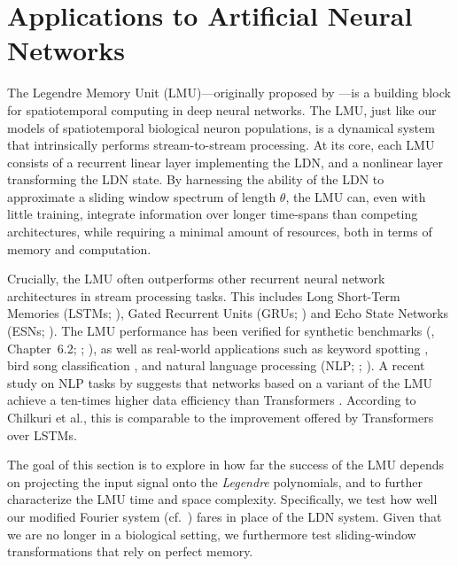 
\section{Applications to Artificial Neural Networks}
\label{sec:applications_to_ml}

The Legendre Memory Unit (LMU)---originally proposed by \citet{voelker2019lmu}---is a building block for spatiotemporal computing in deep neural networks.
The LMU, just like our models of spatiotemporal biological neuron populations, is a dynamical system that intrinsically performs stream-to-stream processing.
At its core, each LMU consists of a recurrent linear layer implementing the LDN, and a nonlinear layer transforming the LDN state.
By harnessing the ability of the LDN to approximate a sliding window spectrum of length $\theta$, the LMU can, even with little training, integrate information over longer time-spans than competing architectures, while requiring a minimal amount of resources, both in terms of memory and computation.

Crucially, the LMU often outperforms other recurrent neural network architectures in stream processing tasks.
This includes Long Short-Term Memories (LSTMs; \cite{hochreiter1997long}), Gated Recurrent Units (GRUs; \cite{chung2014empirical}) and Echo State Networks (ESNs; \cite{jaeger2004harnessing}).
The LMU performance has been verified for synthetic benchmarks (\cite{voelker2019}, Chapter~6.2; \cite{voelker2019lmu}; \cite{gu2020hippo}), as well as real-world applications such as keyword spotting \citep{blouw2021hardware}, bird song classification \citep{gupta2021comparing}, and natural language processing (NLP; \cite{chilkuri2021parallelizinga}; \cite{chilkuri2021parallelizing}).
A recent study on NLP tasks by \citet{chilkuri2021language} suggests that networks based on a variant of the LMU achieve a ten-times higher data efficiency than Transformers \citep{vaswani2017attention}.
According to Chilkuri et al., this is comparable to the improvement offered by Transformers over LSTMs.

The goal of this section is to explore in how far the success of the LMU depends on projecting the input signal onto the \emph{Legendre} polynomials, and to further characterize the LMU time and space complexity.
Specifically, we test how well our modified Fourier system (cf.~) fares in place of the LDN system.
Given that we are no longer in a biological setting, we furthermore test sliding-window transformations that rely on perfect memory.

